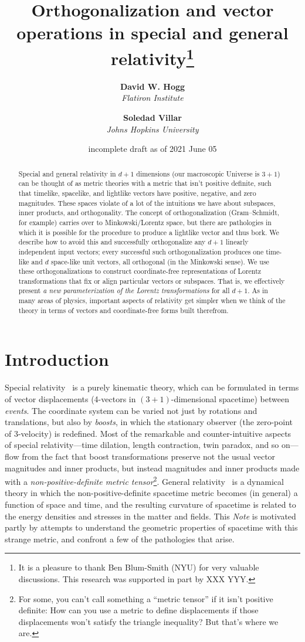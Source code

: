 \documentclass{article}
\title{\bfseries Orthogonalization and vector operations in special and general relativity\footnote{%
It is a pleasure to thank Ben Blum-Smith (NYU) for very valuable discussions. This research was supported in part by XXX YYY.}}
\author{\textbf{David W. Hogg}\\
        \textsl{Flatiron Institute}\\
        \and
        \textbf{Soledad Villar}\\
        \textsl{Johns Hopkins University}}
\date{incomplete draft as of 2021 June 05}
\newcommand{\documentname}{\textsl{Note}}
\begin{document}
\thispagestyle{plain}
\maketitle

\begin{abstract}\noindent
    Special and general relativity in $d+1$ dimensions (our macroscopic Universe is $3+1$) can be thought of as metric theories with a metric that isn't positive definite, such that timelike, spacelike, and lightlike vectors have positive, negative, and zero magnitudes.
    These spaces violate of a lot of the intuitions we have about subspaces, inner products, and orthogonality.
    The concept of orthogonalization (Gram--Schmidt, for example) carries over to Minkowski/Lorentz space, but there are pathologies in which it is possible for the procedure to produce a lightlike vector and thus bork.
    We describe how to avoid this and successfully orthogonalize any $d+1$ linearly independent input vectors; every successful such orthogonalization produces one time-like and $d$ space-like unit vectors, all orthogonal (in the Minkowski sense).
    We use these orthogonalizations to construct coordinate-free representations of Lorentz transformations that fix or align particular vectors or subspaces.
    That is, we effectively present \emph{a new parameterization of the Lorentz transformations} for all $d+1$.
    As in many areas of physics, important aspects of relativity get simpler when we think of the theory in terms of vectors and coordinate-free forms built therefrom.
\end{abstract}

\section{Introduction}\label{sec:intro}

Special relativity~\cite{sr} is a purely kinematic theory, which can be formulated in terms of vector displacements (4-vectors in $(3+1)$-dimensional spacetime) between \emph{events}.
The coordinate system can be varied not just by rotations and translations, but also by \emph{boosts}, in which the stationary observer (the zero-point of 3-velocity) is redefined.
Most of the remarkable and counter-intuitive aspects of special relativity---time dilation, length contraction, twin paradox, and so on---flow from the fact that boost transformations preserve not the usual vector magnitudes and inner products, but instead magnitudes and inner products made with a \emph{non-positive-definite metric tensor}\footnote{For some, you can't call something a ``metric tensor'' if it isn't positive definite: How can you use a metric to define displacements if those displacements won't satisfy the triangle inequality? But that's where we are.}.
General relativity~\cite{gr} is a dynamical theory in which the non-positive-definite spacetime metric becomes (in general) a function of space and time, and the resulting curvature of spacetime is related to the energy densities and stresses in the matter and fields.
This \documentname{} is motivated partly by attempts to understand the geometric properties of spacetime with this strange metric, and confront a few of the pathologies that arise.
\end{document}
